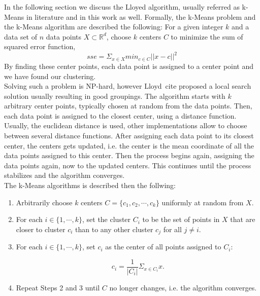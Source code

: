 In the following section we discuss the Lloyed algorithm, usually referred as k-Means in literature and in this work as well. Formally, the k-Means problem and the k-Means algorithm are described the following: For a given integer $k$ and a data set of $n$ data points $X \subset  \mathbb{R}^d$, choose $k$ centers $C$ to minimize the sum of squared error function,
\begin{equation*}
sse = \Sigma_{x \in X} min_{c \in C} ||x - c||^2
\end{equation*}
By finding these center points, each data point is assigned to a center point and we have found our clustering.
\\ 
Solving such a problem is NP-hard, however Lloyd~cite proposed a local search solution usually resulting in good groupings. The algorithm starts with $k$ arbitrary center points, typically chosen at random from the data points. Then, each data point is assigned to the closest center, using a distance function. Usually, the euclidean distance is used, other implementations allow to choose between several distance functions. After assigning each data point to its closest center, the centers gets updated, i.e. the center is the mean coordinate of all the data points assigned to this center. Then the process begins again, assigning the data points again, now to the updated centers. This continues until the process stabilizes and the algorithm converges.
\\
The k-Means algorithms is described then the follwing:

\begin{enumerate} 
\item Arbitrarily choose $k$ centers $C = \{c_1, c_2, \cdots, c_k\}$ uniformly at random from $X$.
\item For each $i \in \{1, \cdots, k\}$, set the cluster $C_i$ to be the set of points in $X$ that are closer to cluster $c_i$ than to any other cluster $c_j$ for all $j \neq i$.
\item For each $i \in \{1, \cdots, k\}$, set $c_i$ as the center of all points assigned to $C_i$: 

\begin{equation*}
c_i = \frac{1}{|C_i|} \Sigma_{x \in C_i} x.
\end{equation*}

\item Repeat Steps 2 and 3 until $C$ no longer changes, i.e. the algorithm converges.
\end{enumerate}


